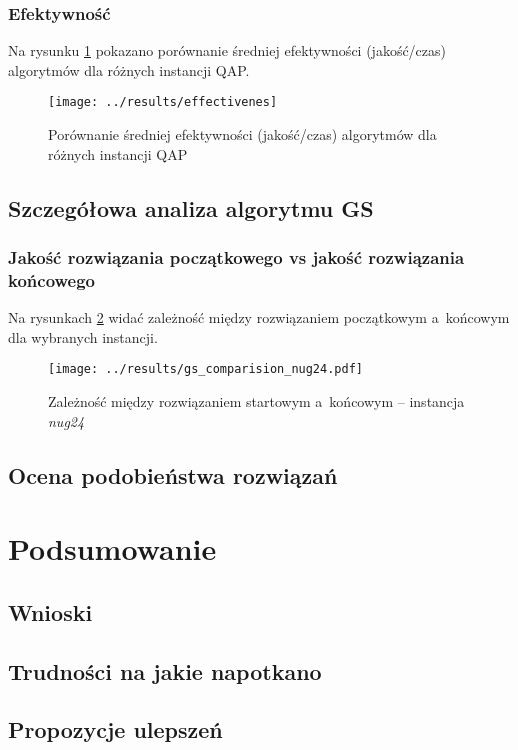 \documentclass{article}
\begin{document}
		\subsubsection{Efektywność}Na rysunku \ref{fig:effectivenes} pokazano porównanie średniej efektywności (jakość/czas) algorytmów dla różnych instancji QAP.
			\begin{figure}[h]
				\texttt{[image: ../results/effectivenes]}
				\caption{Porównanie średniej efektywności (jakość/czas) algorytmów dla różnych instancji QAP\label{fig:effectivenes}}
			\end{figure}


	\subsection{Szczegółowa analiza algorytmu GS}
		\subsubsection{Jakość rozwiązania początkowego vs jakość rozwiązania końcowego}
			Na rysunkach \ref{fig:gs.nug24} widać zależność między rozwiązaniem początkowym a~końcowym dla wybranych instancji.
			\begin{figure}[h]
				\texttt{[image: ../results/gs\_comparision\_nug24.pdf]}
				\caption{Zależność między rozwiązaniem startowym a~końcowym -- instancja \emph{nug24}}
				\label{fig:gs.nug24}
			\end{figure}
	\subsection{Ocena podobieństwa rozwiązań}
\section{Podsumowanie}
	\subsection{Wnioski}
	\subsection{Trudności na jakie napotkano}
	\subsection{Propozycje ulepszeń}




\end{document}
